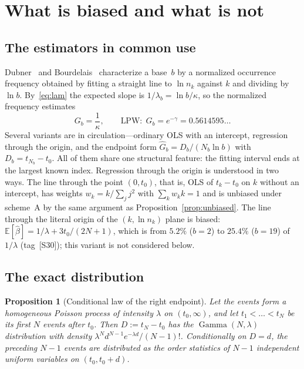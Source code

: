 \documentclass[11pt,a4paper]{article}
\theoremstyle{plain}
\newtheorem{proposition}{Proposition}
\theoremstyle{remark}
\newcommand{\emg}{e^{-\gamma}}
\DeclareMathOperator{\Gam}{Gamma}
\begin{document}
\section{What is biased and what is not}\label{sec:notbias}

\subsection{The estimators in common use}
Dubner~\cite{dubner1993} and Bourdelais~\cite{bourdelais2009} characterize a
base~$b$ by a normalized occurrence frequency obtained by fitting a straight
line to $\ln n_k$ against $k$ and dividing by $\ln b$. By~\eqref{eq:lam} the
expected slope is $1/\lambda_b=\ln b/\kappa$, so the normalized frequency
estimates
\begin{equation}\label{eq:G}
G_b=\frac{1}{\kappa},\qquad\text{LPW:}\ \ G_b=\emg=0.5614595\ldots
\end{equation}
Several variants are in circulation---ordinary OLS with an intercept, regression
through the origin, and the endpoint form $\hat G_b=D_b/(N_b\ln b)$ with
$D_b=t_{N_b}-t_0$. All of them share one structural feature: the fitting
interval ends at the largest known index. Regression through the origin is
understood in two ways. The line through the point $(0,t_0)$, that is, OLS of
$t_k-t_0$ on $k$ without an intercept, has weights $w_k=k/\sum_jj^2$ with
$\sum_kw_kk=1$ and is unbiased under scheme~A by the same argument as
Proposition~\ref{prop:unbiased}. The line through the literal origin of the
$(k,\ln n_k)$ plane is biased: $\mathbb E[\hat\beta]=1/\lambda+3t_0/(2N+1)$, which
is from $5.2\%$ ($b=2$) to $25.4\%$ ($b=19$) of $1/\lambda$ (tag~[S30]); this
variant is not considered below.

\subsection{The exact distribution}

\begin{proposition}[Conditional law of the right endpoint]\label{prop:gamma}
Let the events form a homogeneous Poisson process of intensity $\lambda$ on
$(t_0,\infty)$, and let $t_1<\dots<t_N$ be its first $N$ events after $t_0$.
Then $D:=t_N-t_0$ has the $\Gam(N,\lambda)$ distribution with density
$\lambda^{N}d^{N-1}e^{-\lambda d}/(N-1)!$. Conditionally on $D=d$, the preceding
$N-1$ events are distributed as the order statistics of $N-1$ independent
uniform variables on $(t_0,t_0+d)$.
\end{proposition}
\end{document}
